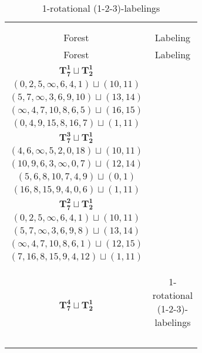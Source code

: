 \documentclass{article}
\begin{document}
    \begin{longtable}{|c|c|}
        \hline
        \caption{1-rotational (1-2-3)-labelings}\\
        \endfoot
        
        \hline
        \caption{1-rotational (1-2-3)-labelings}\\
        \endlastfoot
        \hline
        Forest & Labeling \\
        \hline
        \endfirsthead
        \hline
        Forest & Labeling \\
        \hline
        \endhead
        $\mathbf{T_{7}^{1}} \sqcup \mathbf{T_{2}^{1}}$ & \begin{tabular}{c}
        $(0,1,\infty,2,4,5,3)\sqcup(12,15)$ \\ 
        $(0,2,5,\infty,6,4,1)\sqcup(10,11)$ \\ 
        $(5,7,\infty,3,6,9,10)\sqcup(13,14)$ \\ 
        $(\infty,4,7,10,8,6,5)\sqcup(16,15)$ \\ 
        $(0,4,9,15,8,16,7)\sqcup(1,11)$
        \end{tabular} \\ 
        \hline
        $\mathbf{T_{7}^{3}} \sqcup \mathbf{T_{2}^{1}}$ & \begin{tabular}{c}
        $(3,5,4,2,\infty,8,1)\sqcup(12,15)$ \\ 
        $(4,6,\infty,5,2,0,18)\sqcup(10,11)$ \\ 
        $(10,9,6,3,\infty,0,7)\sqcup(12,14)$ \\ 
        $(5,6,8,10,7,4,9)\sqcup(0,1)$ \\ 
        $(16,8,15,9,4,0,6)\sqcup(1,11)$
        \end{tabular} \\ 
        \hline
        $\mathbf{T_{7}^{2}} \sqcup \mathbf{T_{2}^{1}}$ & \begin{tabular}{c}
        $(3,5,4,2,\infty,1,6)\sqcup(9,10)$ \\ 
        $(0,2,5,\infty,6,4,1)\sqcup(10,11)$ \\ 
        $(5,7,\infty,3,6,9,8)\sqcup(13,14)$ \\ 
        $(\infty,4,7,10,8,6,1)\sqcup(12,15)$ \\ 
        $(7,16,8,15,9,4,12)\sqcup(1,11)$
        \end{tabular} \\ 
        \hline
        $\mathbf{T_{7}^{4}} \sqcup \mathbf{T_{2}^{1}}$ & \begin{tabular}{c}

\end{tabular}
\end{longtable}
\end{document}
